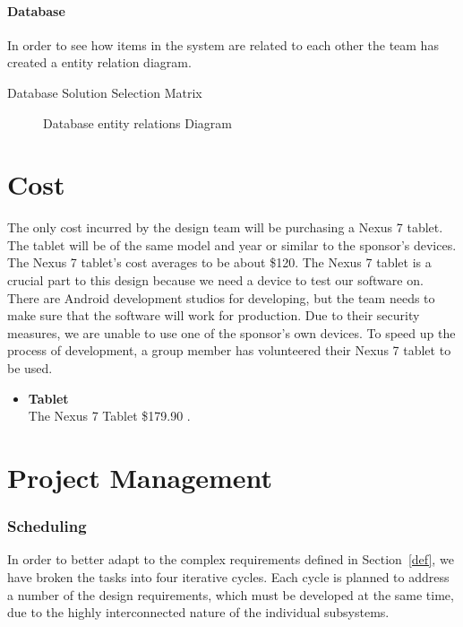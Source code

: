 \documentclass[Letter,11pt]{article}
\begin{document}
	
	\subsection{Database}
		In order to see how items in the system are related to each other the team has created a entity relation diagram.
		\begin{table}[h]
			\centering
			
			\caption{\label{DBMatrix} Database Solution Selection Matrix}
		\end{table}
		
		\begin{figure}[h]
			\centering
			
			\caption{\label{ERdiogram} Database entity relations Diagram}
		\end{figure}
	

		
	
\part{Cost}
The only cost incurred by the design team will be purchasing a Nexus 7 tablet. The tablet will be of the same model and year or similar to the sponsor's devices. The Nexus 7 tablet's cost averages to be about \$120. The Nexus 7 tablet is a crucial part to this design because we need a device to test our software on. There are Android development studios for developing, but the team needs to make sure that the software will work for production.  Due to their security measures, we are unable to use one of the sponsor's own devices. To speed up the process of development, a group member has volunteered their Nexus 7 tablet to be used. \\
	    \begin{itemize}
	    \item \textbf{Tablet}\\
		    The Nexus 7 Tablet \$179.90 \cite{nexus7}.\\
		    \end{itemize}
\part{Project Management}
\section{Scheduling}
		In order to better adapt to the complex requirements defined in Section~\ref{def}, we have broken the tasks into four iterative cycles. Each cycle is planned to address a number of the design requirements, which must be developed at the same time, due to the highly interconnected nature of the individual subsystems. 
		
\end{document}
